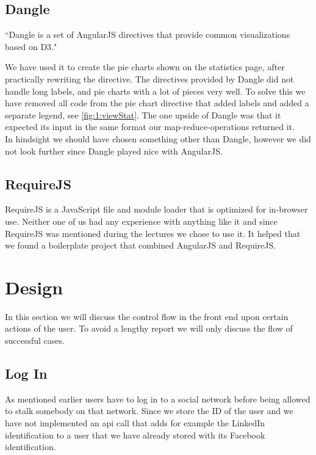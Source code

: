 	\subsection{Dangle}
	\label{ssec:1:dangle}
		``Dangle is a set of AngularJS directives that provide common visualizations based on D3."\cite{dangle}

		We have used it to create the pie charts shown on the statistics page, after practically rewriting the directive. The directives provided by Dangle did not handle long labels, and pie charts with a lot of pieces very well. To solve this we have removed all code from the pie chart directive that added labels and added a separate legend, see \vref{fig:1:viewStat}. The one upside of Dangle was that it expected its input in the same format our map-reduce-operations returned it. \\

		In hindsight we should have chosen something other than Dangle, however we did not look further since Dangle played nice with AngularJS. 

	\subsection{RequireJS}
	\label{ssec:1:requirejs}
		RequireJS is a JavaScript file and module loader that is optimized for in-browser use. Neither one of us had any experience with anything like it and since RequireJS was mentioned during the lectures we chose to use it. It helped that we found a boilerplate project that combined AngularJS and RequireJS. 	

\section{Design}
\label{sec:1:design}
	In this section we will discuss the control flow in the front end upon certain actions of the user. To avoid a lengthy report we will only discuss the flow of successful cases.

	\subsection{Log In}
		As mentioned earlier users have to log in to a social network before being allowed to stalk somebody on that network. Since we store the ID of the user and we have not implemented an api call that adds for example the LinkedIn identification to a user that we have already stored with its Facebook identification.

